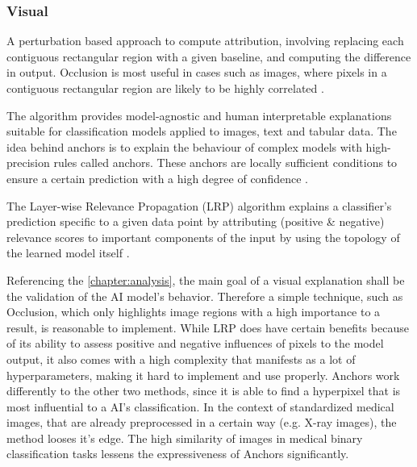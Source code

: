 \documentclass[11pt,a4paper,english]{scrreprt}
\begin{document}
\subsubsection*{Visual}
\begin{description}[font=\normalfont\itshape]
    \item[Occlusion:] A perturbation based approach to compute attribution, involving replacing each contiguous rectangular region with a given baseline, and computing the difference in output. Occlusion is most useful in cases such as images, where pixels in a contiguous rectangular region are likely to be highly correlated \parencite{captum_website,zeiler_visualizing_2013}.
    \item[Anchors:] The algorithm provides model-agnostic and human interpretable explanations suitable for classification models applied to images, text and tabular data. The idea behind anchors is to explain the behaviour of complex models with high-precision rules called anchors. These anchors are locally sufficient conditions to ensure a certain prediction with a high degree of confidence \parencite{ribeiro_anchors_2018}.
    \item[LRP:] The Layer-wise Relevance Propagation (LRP) algorithm explains a classifier's prediction specific to a given data point by attributing (positive \& negative) relevance scores to important components of the input by using the topology of the learned model itself \parencite{lapuschkin_unmasking_2019}.
\end{description}
Referencing the \autoref{chapter:analysis}, the main goal of a visual explanation shall be the validation of the AI model's behavior. Therefore a simple technique, such as Occlusion, which only highlights image regions with a high importance to a result, is reasonable to implement. While LRP does have certain benefits because of its ability to assess positive and negative influences of pixels to the model output, it also comes with a high complexity that manifests as a lot of hyperparameters, making it hard to implement and use properly. Anchors work differently to the other two methods, since it is able to find a hyperpixel that is most influential to a AI's classification. In the context of standardized medical images, that are already preprocessed in a certain way (e.g. X-ray images), the method looses it's edge. The high similarity of images in medical binary classification tasks lessens the expressiveness of Anchors significantly.    
\end{document}
